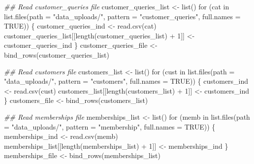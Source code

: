 \documentclass[
  letterpaper,
  DIV=11,
  numbers=noendperiod]{scrartcl}
\newenvironment{Shaded}{\begin{snugshade}}{\end{snugshade}}
\newcommand{\AttributeTok}[1]{\textcolor[rgb]{0.40,0.45,0.13}{#1}}
\newcommand{\ConstantTok}[1]{\textcolor[rgb]{0.56,0.35,0.01}{#1}}
\newcommand{\ControlFlowTok}[1]{\textcolor[rgb]{0.00,0.23,0.31}{#1}}
\newcommand{\DecValTok}[1]{\textcolor[rgb]{0.68,0.00,0.00}{#1}}
\newcommand{\DocumentationTok}[1]{\textcolor[rgb]{0.37,0.37,0.37}{\textit{#1}}}
\newcommand{\FunctionTok}[1]{\textcolor[rgb]{0.28,0.35,0.67}{#1}}
\newcommand{\NormalTok}[1]{\textcolor[rgb]{0.00,0.23,0.31}{#1}}
\newcommand{\OtherTok}[1]{\textcolor[rgb]{0.00,0.23,0.31}{#1}}
\newcommand{\SpecialCharTok}[1]{\textcolor[rgb]{0.37,0.37,0.37}{#1}}
\newcommand{\StringTok}[1]{\textcolor[rgb]{0.13,0.47,0.30}{#1}}
\begin{document}
\begin{Shaded}
\begin{Highlighting}[numbers=left,,]
\DocumentationTok{\#\# Read customer\_queries file}
\NormalTok{customer\_queries\_list }\OtherTok{\textless{}{-}} \FunctionTok{list}\NormalTok{()}
\ControlFlowTok{for}\NormalTok{ (cat }\ControlFlowTok{in} \FunctionTok{list.files}\NormalTok{(}\AttributeTok{path =} \StringTok{"data\_uploads/"}\NormalTok{, }\AttributeTok{pattern =} \StringTok{"customer\_queries"}\NormalTok{, }\AttributeTok{full.names =} \ConstantTok{TRUE}\NormalTok{)) \{}
\NormalTok{  customer\_queries\_ind }\OtherTok{\textless{}{-}} \FunctionTok{read.csv}\NormalTok{(cat)}
\NormalTok{  customer\_queries\_list[[}\FunctionTok{length}\NormalTok{(customer\_queries\_list) }\SpecialCharTok{+} \DecValTok{1}\NormalTok{]] }\OtherTok{\textless{}{-}}\NormalTok{ customer\_queries\_ind}
\NormalTok{\}}
\NormalTok{customer\_queries\_file }\OtherTok{\textless{}{-}} \FunctionTok{bind\_rows}\NormalTok{(customer\_queries\_list)}

\DocumentationTok{\#\# Read customers file}
\NormalTok{customers\_list }\OtherTok{\textless{}{-}} \FunctionTok{list}\NormalTok{()}
\ControlFlowTok{for}\NormalTok{ (cust }\ControlFlowTok{in} \FunctionTok{list.files}\NormalTok{(}\AttributeTok{path =} \StringTok{"data\_uploads/"}\NormalTok{, }\AttributeTok{pattern =} \StringTok{"customers"}\NormalTok{, }\AttributeTok{full.names =} \ConstantTok{TRUE}\NormalTok{)) \{}
\NormalTok{  customers\_ind }\OtherTok{\textless{}{-}} \FunctionTok{read.csv}\NormalTok{(cust)}
\NormalTok{  customers\_list[[}\FunctionTok{length}\NormalTok{(customers\_list) }\SpecialCharTok{+} \DecValTok{1}\NormalTok{]] }\OtherTok{\textless{}{-}}\NormalTok{ customers\_ind}
\NormalTok{\}}
\NormalTok{customers\_file }\OtherTok{\textless{}{-}} \FunctionTok{bind\_rows}\NormalTok{(customers\_list)}

\DocumentationTok{\#\# Read memberships file}
\NormalTok{memberships\_list }\OtherTok{\textless{}{-}} \FunctionTok{list}\NormalTok{()}
\ControlFlowTok{for}\NormalTok{ (memb }\ControlFlowTok{in} \FunctionTok{list.files}\NormalTok{(}\AttributeTok{path =} \StringTok{"data\_uploads/"}\NormalTok{, }\AttributeTok{pattern =} \StringTok{"membership"}\NormalTok{, }\AttributeTok{full.names =} \ConstantTok{TRUE}\NormalTok{)) \{}
\NormalTok{  memberships\_ind }\OtherTok{\textless{}{-}} \FunctionTok{read.csv}\NormalTok{(memb)}
\NormalTok{  memberships\_list[[}\FunctionTok{length}\NormalTok{(memberships\_list) }\SpecialCharTok{+} \DecValTok{1}\NormalTok{]] }\OtherTok{\textless{}{-}}\NormalTok{ memberships\_ind}
\NormalTok{\}}
\NormalTok{memberships\_file }\OtherTok{\textless{}{-}} \FunctionTok{bind\_rows}\NormalTok{(memberships\_list)}


\end{Highlighting}
\end{Shaded}
\end{document}
